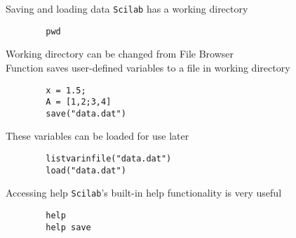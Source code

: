 \documentclass[%
    10pt,
    xcolor={dvipsnames},
    handout,
]{beamer}
\newcommand{\inlinecode}[1]{\inlinecodebox{#1}} %
\newcommand{\scilab}{\texttt{Scilab}}
\begin{document}
\begin{frame}[fragile]{Saving and loading data}
    \scilab{} has a working directory
    \begin{lstlisting}
        pwd
    \end{lstlisting}
    Working directory can be changed from File Browser\\[0.5em]
    Function \inlinecode{save} saves user-defined variables to a file in working directory
    \begin{lstlisting}
        x = 1.5;
        A = [1,2;3,4]
        save("data.dat")
    \end{lstlisting}
    These variables can be loaded for use later
    \begin{lstlisting}
        listvarinfile("data.dat")
        load("data.dat")
    \end{lstlisting}
\end{frame}

\begin{frame}[fragile]{Accessing help}
    \scilab's built-in help functionality is very useful
    \begin{lstlisting}
        help
        help save
    \end{lstlisting}
\end{frame}
\end{document}
